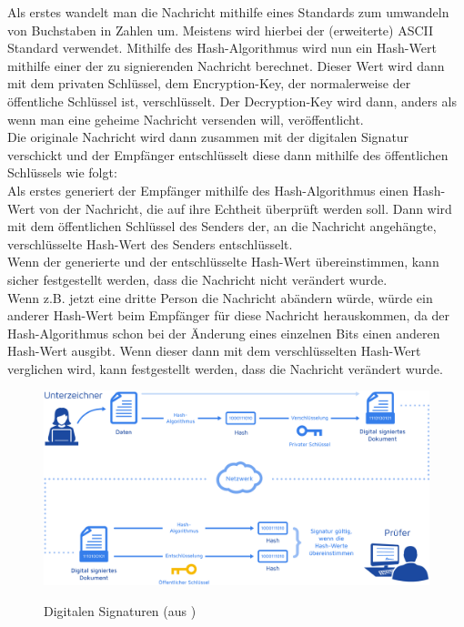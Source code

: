 \documentclass[12pt,a4paper]{scrartcl}
\begin{document}
Als erstes wandelt man die Nachricht mithilfe eines Standards zum umwandeln von Buchstaben in Zahlen um. Meistens wird hierbei der (erweiterte) ASCII Standard verwendet. %
Mithilfe des Hash-Algorithmus wird nun ein Hash-Wert mithilfe einer  der zu signierenden Nachricht berechnet. Dieser Wert wird dann mit dem privaten Schlüssel, dem Encryption-Key, der normalerweise der öffentliche Schlüssel ist, verschlüsselt. %
	Der Decryption-Key wird dann, anders als wenn man eine geheime Nachricht versenden will, veröffentlicht.\\
	Die originale Nachricht wird dann zusammen mit der digitalen Signatur verschickt und der Empfänger entschlüsselt diese dann mithilfe des öffentlichen Schlüssels wie folgt:\\
	Als erstes generiert der Empfänger mithilfe des Hash-Algorithmus einen Hash-Wert von der Nachricht, die auf ihre Echtheit überprüft werden soll. Dann wird mit dem öffentlichen Schlüssel des Senders der, an die Nachricht angehängte, verschlüsselte Hash-Wert des Senders entschlüsselt. \\
Wenn der generierte und der entschlüsselte Hash-Wert übereinstimmen, kann sicher festgestellt werden, dass die Nachricht nicht verändert wurde. \\
Wenn z.B. jetzt eine dritte Person die Nachricht abändern würde, würde ein anderer Hash-Wert beim Empfänger für diese Nachricht herauskommen, da der Hash-Algorithmus schon bei der Änderung eines einzelnen Bits einen anderen Hash-Wert ausgibt. Wenn dieser dann mit dem verschlüsselten Hash-Wert verglichen wird, kann festgestellt werden, dass die Nachricht verändert wurde.


\begin{figure}
\includegraphics[scale=0.45]{Dokument_digitale_Signatur} \\
\caption{Digitalen Signaturen (aus \cite{digitalsignature})}
\label{fig:figure3}
\end{figure}
\end{document}

